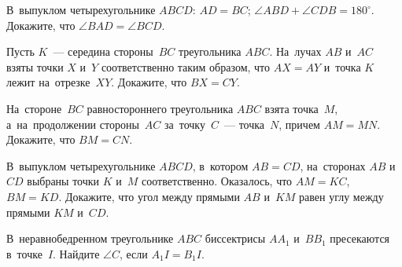 


\begin{problems}

\item
В~выпуклом четырехугольнике $ABCD$:
$AD = BC$; $\angle ABD + \angle CDB = 180^{\circ}$.
Докажите, что $\angle BAD = \angle BCD$.

\item
Пусть $K$~--- середина стороны~$BC$ треугольника $ABC$.
На~лучах $AB$ и~$AC$ взяты точки $X$ и~$Y$ соответственно таким образом, что
$AX = AY$ и~точка $K$ лежит на~отрезке~$XY$.
Докажите, что $BX = CY$.

\item
На~стороне~$BC$ равностороннего треугольника $ABC$ взята точка~$M$,
а~на~продолжении стороны~$AC$ за~точку~$C$~--- точка~$N$, причем $AM = MN$.
Докажите, что $BM = CN$.

\item
В~выпуклом четырехугольнике $ABCD$, в~котором $AB = CD$, на~сторонах $AB$
и~$CD$ выбраны точки $K$ и~$M$ соответственно.
Оказалось, что $AM = KC$, $BM = KD$.
Докажите, что угол между прямыми $AB$ и~$KM$ равен углу между
прямыми $KM$ и~$CD$.

\item
В~неравнобедренном треугольнике $ABC$ биссектрисы $A A_1$ и~$B B_1$ пресекаются
в~точке~$I$.
Найдите $\angle C$, если $A_1 I = B_1 I$.


\end{problems}

